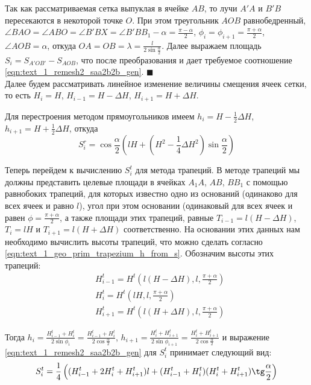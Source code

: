 Так как рассматриваемая сетка выпуклая в ячейке $AB$, то лучи $A'A$ и $B'B$ пересекаются в некоторой точке $O$.
При этом треугольник $AOB$ равнобедренный, $\angle BAO = \angle ABO = \angle B'BX = \angle B'BB_1 - \alpha = \frac{\pi - \alpha}{2}$, $\phi_i = \phi_{i + 1} = \frac{\pi + \alpha}{2}$, $\angle AOB = \alpha$, откуда $OA = OB = \lambda = \frac{l}{2 \sin \frac{\alpha}{2}}$.
Далее выражаем площадь $S_i = S_{A'OB'} - S_{AOB}$, что после преобразования и дает требуемое соотношение \eqref{eqn:text_1_remesh2_saa2b2b_gen}.
$\blacksquare$\\

Далее будем рассматривать линейное изменение величины смещения ячеек сетки, то есть $H_i = H$, $H_{i - 1} = H - \Delta H$, $H_{i + 1} = H + \Delta H$.

Для перестроения методом прямоугольников имеем $h_i = H - \frac{1}{2} \Delta H$, $h_{i + 1} = H + \frac{1}{2} \Delta H$, откуда
\begin{equation}\label{eqn:text_1_remesh2_s_rect}
	S_i^r = \cos \frac{\alpha}{2} \left( lH + ( H^2 - \frac{1}{4} \Delta H^2) \sin \frac{\alpha}{2} \right)
\end{equation}

Теперь перейдем к вычислению $S_i^t$ для метода трапеций.
В методе трапеций мы должны представить целевые площади в ячейках $A_1A$, $AB$, $BB_1$ с помощью равнобоких трапеций, для которых известно одно из оснований (одинаково для всех ячеек и равно $l$), угол при этом основании (одинаковый для всех ячеек и равен $\phi = \frac{\pi + \alpha}{2}$, а также площади этих трапеций, равные $T_{i - 1} = l(H - \Delta H)$, $T_i = lH$ и $T_{i + 1} = l(H + \Delta H)$ соответственно.
На основании этих данных нам необходимо вычислить высоты трапеций, что можно сделать согласно \eqref{eqn:text_1_geo_prim_trapezium_h_from_s}.
Обозначим высоты этих трапеций:
\begin{equation}
	\begin{aligned}\label{eqn:text_1_remesh_2_Ht_vypukl}
		& H_{i - 1}^t = H^t\left(l(H - \Delta H), l, \frac{\pi + \alpha}{2}\right) \\ 
		& H_i^t = H^t\left(lH, l, \frac{\pi + \alpha}{2}\right) \\
		& H_{i + 1}^t = H^t\left(l(H + \Delta H), l, \frac{\pi + \alpha}{2}\right)
	\end{aligned}
\end{equation}

Тогда $h_i = \frac{H_{i - 1}^t + H_i^t}{2 \sin \phi_i} = \frac{H_{i - 1}^t + H_i^t}{2 \cos \frac{\alpha}{2}}$, $h_{i+1} = \frac{H_i^t + H_{i+1}^t}{2 \sin \phi_{i + 1}} = \frac{H_i^t + H_{i+1}^t}{2 \cos \frac{\alpha}{2}}$ и выражение \eqref{eqn:text_1_remesh2_saa2b2b_gen} для $S_i^t$ принимает следующий вид:
\begin{equation}\label{eqn:text_1_remesh2_trap}
	S_i^t = \frac{1}{4} \left( (H_{i - 1}^t + 2 H_i^t + H_{i + 1}^t)l + (H_{i - 1}^t + H_i^t) (H_i^t + H_{i+1}^t) \tg \frac{\alpha}{2} \right)
\end{equation}

